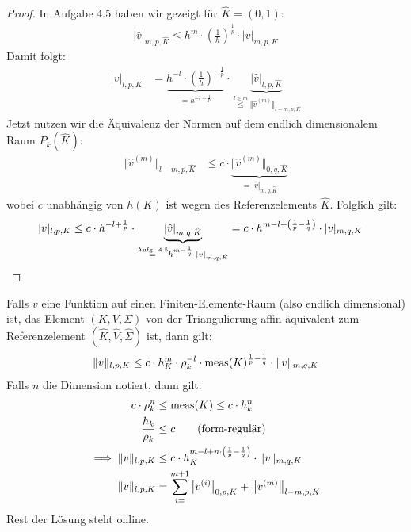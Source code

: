 \begin{proof}
	In Aufgabe 4.5 haben wir gezeigt für $\hat{K}=(0,1)$:
	\begin{align*}
		|\hat{v}|_{m,p,\hat{K}}\leq h^m\cdot\left(\frac{1}{h}\right)^{\frac{1}{p}}\cdot|v|_{m,p,K}
	\end{align*}
	Damit folgt:
	\begin{align*}
		|v|_{l,p,K}
		&=\underbrace{h^{-l}\cdot\left(\frac{1}{h}\right)^{-\frac{1}{p}}}_{=h^{-l+\frac{1}{p}}}\cdot\underbrace{|\hat{v}|_{l,p,\hat{K}}}_{\stackrel{l\geq m}{\leq}\Vert \hat{v}^{(m)}\Vert_{l-m,p,\hat{K}}}
	\end{align*}
	Jetzt nutzen wir die Äquivalenz der Normen auf dem endlich dimensionalem Raum $P_k(\hat{K})$:
	\begin{align*}
		\Vert \hat{v}^{(m)}\Vert_{l-m,p,\hat{K}}
		&\leq
		c\cdot\underbrace{\Vert\hat{v}^{(m)}\Vert_{0,q,\hat{K}}}_{=|\hat{v}|_{m,q,\hat{K}}}
	\end{align*}
	wobei $c$ unabhängig von $h(K)$ ist wegen des Referenzelements $\hat{K}$. Folglich gilt:
	\begin{align*}
		|v|_{l,p,K}
		&\leq
		c\cdot h^{-l+\frac{1}{p}}\cdot\underbrace{|\hat{v}|_{m,q,\hat{K}}}_{\stackrel{\text{Aufg. 4.5}}{=}h^{m-\frac{1}{q}}\cdot|v|_{m,q,\hat{K}}}
		=c\cdot h^{m-l+\left(\frac{1}{p}-\frac{1}{q}\right)}\cdot|v|_{m,q,K}
		\qedhere
	\end{align*}
\end{proof}

\begin{bemerkung}
	Falls $v$ eine Funktion auf einen Finiten-Elemente-Raum (also endlich dimensional) ist, das Element $(K,V,\Sigma)$ von der Triangulierung affin äquivalent zum Referenzelement $(\hat{K},\hat{V},\hat{\Sigma})$ ist, dann gilt:
	\begin{align*}
		\Vert v\Vert_{l,p,K}\leq c\cdot h_K^m\cdot\rho_k^{-l}\cdot\operatorname{meas}(K)^{\frac{1}{p}-\frac{1}{q}}\cdot\Vert v\Vert_{m,q,K}
	\end{align*}
	Falls $n$ die Dimension notiert, dann gilt:
	\begin{align*}
		c\cdot \rho_k^n&\leq\operatorname{meas}(K)\leq c\cdot h_k^n\\
		\frac{h_k}{\rho_k}&\leq c\qquad\text{(form-regulär)}\\
		\implies\Vert v\Vert_{l,p,K}&\leq c\cdot h_K^{m-l+n\cdot\left(\frac{1}{p}-\frac{1}{q}\right)}\cdot\Vert v\Vert_{m,q,K}\\
		\Vert v\Vert_{l,p,K}&=\sum\limits_{i=}^{m+1}\big| v^{(i)}\big|_{0,p,K}+\big\Vert v^{(m)}\big\Vert_{l-m,p,K}
	\end{align*}
	Rest der Lösung steht online.
\end{bemerkung}

